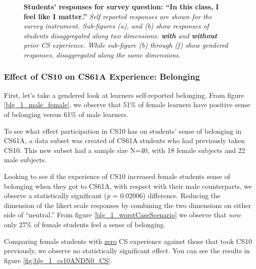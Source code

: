 \documentclass[oneside,titlepage,numbers=noenddot,headinclude,%
               footinclude=true,cleardoublepage=empty,abstractoff,BCOR=2mm,%
               paper=a4,fontsize=11pt,ngerman,american]{scrreprt}
\numberwithin{theorem}{chapter}
\numberwithin{definition}{chapter}
\numberwithin{algorithm}{chapter}
\numberwithin{figure}{chapter}
\numberwithin{table}{chapter}
\numberwithin{equation}{chapter}
\begin{document}
\begin{figure}[!htbp]
{    \label{fig:blg_4_female_CS}}
\caption{\textbf{Students' responses for survey question: ``In this class, I feel like I matter.''} \textit{Self reported responses are shown for the survey instrument. Sub-figures (a), and (b) show responses of students disaggregated along two dimensions: \textbf{with} and \textbf{without} prior CS experience. While sub-figure (b) through (f) show gendered responses, disaggregated along the same dimensions.}}
\label{blg_4_dis}
\end{figure}


\subsubsection *{Effect of CS10 on CS61A Experience: Belonging}
First, let's take a gendered look at learners self-reported belonging. From figure \ref{blg_1_male_female}, we observe that 51\% of female learners have positive sense of belonging versus 61\% of male learners.

To see what effect participation in CS10 has on students' sense of belonging in CS61A, a data subset was created of CS61A students who had previously taken CS10. This new subset had a sample size N=40, with 18 female subjects and 22 male subjects.

Looking to see if the experience of CS10 increased female students sense of belonging when they got to CS61A, with respect with their male counterparts, we observe a statistically significant (\emph{p} = 0.02006) difference. Reducing the dimension of the likert scale responses by combining the two dimensions on either side of ``neutral.'' From figure \ref{blg_1_worstCaseScenario} we observe that \emph{now} only 27\% of female students feel a sense of belonging.

Comparing female students with \underline{zero} CS experience against those that took CS10 previously, we observe no statistically significant effect. You can see the results in figure \ref{fig:blg_1_cs10ANDN0_CS}.
\end{document}
